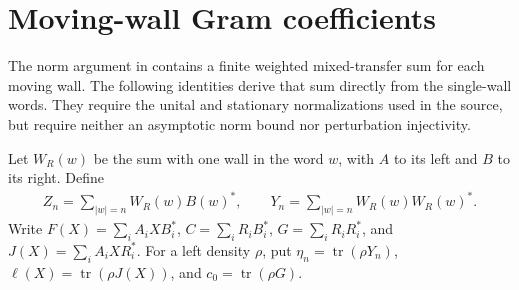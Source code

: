 \section{Moving-wall Gram coefficients}
\label{sec:uncle_wall_gram}

The norm argument in
\cite[proof of the low-energy-state lemma]{FernandezGonzalez2015Uncle}
contains a finite weighted mixed-transfer sum for each moving wall. The
following identities derive that sum directly from the single-wall words.
They require the unital and stationary normalizations used in the source,
but require neither an asymptotic norm bound nor perturbation injectivity.

\begin{definition}
    \label{def:uncle_wall_gram}
    \leanok
    Let $W_R(w)$ be the sum with one wall in the word $w$, with $A$ to
    its left and $B$ to its right. Define
    \begin{align}
        Z_n=\sum_{|w|=n}W_R(w)B(w)^*,\qquad
        Y_n=\sum_{|w|=n}W_R(w)W_R(w)^*.
    \end{align}
    Write $F(X)=\sum_i A_iXB_i^*$,
    $C=\sum_i R_iB_i^*$, $G=\sum_iR_iR_i^*$, and
    $J(X)=\sum_i A_iXR_i^*$. For a left density $\rho$, put
    $\eta_n=\operatorname{tr}(\rho Y_n)$,
    $\ell(X)=\operatorname{tr}(\rho J(X))$, and
    $c_0=\operatorname{tr}(\rho G)$.
\end{definition}

